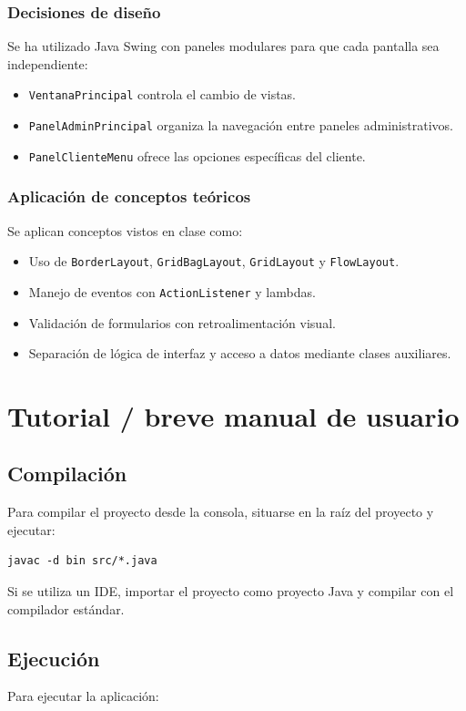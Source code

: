 \documentclass[12pt,a4paper]{report}
\begin{document}
\subsection{Decisiones de diseño}
Se ha utilizado Java Swing con paneles modulares para que cada pantalla sea independiente:
\begin{itemize}
    \item \texttt{VentanaPrincipal} controla el cambio de vistas.
    \item \texttt{PanelAdminPrincipal} organiza la navegación entre paneles administrativos.
    \item \texttt{PanelClienteMenu} ofrece las opciones específicas del cliente.
\end{itemize}

\subsection{Aplicación de conceptos teóricos}
Se aplican conceptos vistos en clase como:
\begin{itemize}
    \item Uso de \texttt{BorderLayout}, \texttt{GridBagLayout}, \texttt{GridLayout} y \texttt{FlowLayout}.
    \item Manejo de eventos con \texttt{ActionListener} y lambdas.
    \item Validación de formularios con retroalimentación visual.
    \item Separación de lógica de interfaz y acceso a datos mediante clases auxiliares.
\end{itemize}

\chapter{Tutorial / breve manual de usuario}
\section{Compilación}
Para compilar el proyecto desde la consola, situarse en la raíz del proyecto y ejecutar:

\begin{verbatim}
javac -d bin src/*.java
\end{verbatim}

Si se utiliza un IDE, importar el proyecto como proyecto Java y compilar con el compilador estándar.

\section{Ejecución}
Para ejecutar la aplicación:
\end{document}
